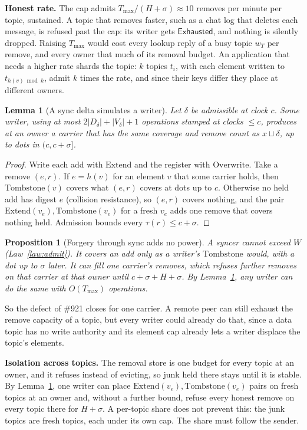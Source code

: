 \documentclass[journal]{IEEEtran}
\newtheorem{lemma}{Lemma}
\newtheorem{proposition}{Proposition}
\newcommand{\Exhausted}{\mathsf{Exhausted}}
\newcommand{\dg}{h}
\newcommand{\Tmax}{T_{\max}}
\newcommand{\issue}[1]{\#{#1}}
\begin{document}
\textbf{Honest rate.}  The cap admits $\Tmax/(H+\sigma)\approx10$ removes per minute per topic,
sustained.  A topic that removes faster, such as a chat log that deletes each message, is
refused past the cap: its writer gets $\Exhausted$, and nothing is silently dropped.  Raising
$\Tmax$ would cost every lookup reply of a busy topic $w_T$ per remove, and every owner that
much of its removal budget.  An application that needs a higher rate shards the topic: $k$
topics $t_i$, with each element written to $t_{\dg(v)\bmod k}$, admit $k$ times the rate, and
since their keys differ they place at different owners.

\begin{lemma}[A sync delta simulates a writer]\label{lem:simulate}
Let $\delta$ be admissible at clock $c$.  Some writer, using at most
$2|D_\delta|+|V_\delta|+1$ operations stamped at clocks $\le c$, produces at an owner a
carrier that has the same coverage and remove count as $x\sqcup\delta$, up to dots in
$(c,c+\sigma]$.
\end{lemma}
\begin{proof}
Write each add with $\mathrm{Extend}$ and the register with $\mathrm{Overwrite}$.  Take a
remove $(e,r)$.  If $e=\dg(v)$ for an element $v$ that some carrier holds, then
$\mathrm{Tombstone}(v)$ covers what $(e,r)$ covers at dots up to $c$.  Otherwise no
held add has digest $e$ (collision resistance), so $(e,r)$ covers nothing, and the pair
$\mathrm{Extend}(v_e),\mathrm{Tombstone}(v_e)$ for a fresh $v_e$ adds one remove that covers
nothing held.  Admission bounds every $\tau(r)\le c+\sigma$.
\end{proof}

\begin{proposition}[Forgery through sync adds no power]\label{prop:forge}
A syncer cannot exceed $W$ (Law~\ref{law:admit}).  It covers an add only as a writer's
$\mathrm{Tombstone}$ would, with a dot up to $\sigma$ later.  It can fill one carrier's
removes, which refuses further removes on that carrier at that owner until
$c+\sigma+H+\sigma$.  By Lemma~\ref{lem:simulate}, any writer can do the same with
$O(\Tmax)$ operations.
\end{proposition}

So the defect of \issue{921} closes for one carrier.  A remote peer can still exhaust the
remove capacity of a topic, but every writer could already do that, since a data topic has no
write authority and its element cap already lets a writer displace the topic's elements.

\textbf{Isolation across topics.}  The removal store is one budget for every topic at an
owner, and it refuses instead of evicting, so junk held there stays until it is stable.  By
Lemma~\ref{lem:simulate}, one writer can place $\mathrm{Extend}(v_e),\mathrm{Tombstone}(v_e)$
pairs on fresh topics at an owner and, without a further bound, refuse every honest remove on
every topic there for $H+\sigma$.  A per-topic share does not prevent this: the junk topics
are fresh topics, each under its own cap.  The share must follow the sender.
\end{document}
